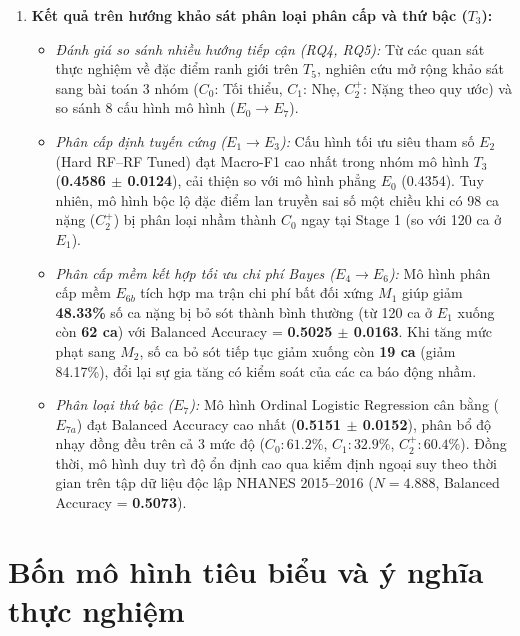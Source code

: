 \begin{enumerate}
    \item \textbf{Kết quả trên hướng khảo sát phân loại phân cấp và thứ bậc ($T_3$):}
    \begin{itemize}
        \item \textit{Đánh giá so sánh nhiều hướng tiếp cận (RQ4, RQ5):} Từ các quan sát thực nghiệm về đặc điểm ranh giới trên $T_5$, nghiên cứu mở rộng khảo sát sang bài toán 3 nhóm ($C_0$: Tối thiểu, $C_1$: Nhẹ, $C_2^+$: Nặng theo quy ước) và so sánh 8 cấu hình mô hình ($E_0 \to E_7$).
        \item \textit{Phân cấp định tuyến cứng ($E_1 \to E_3$):} Cấu hình tối ưu siêu tham số $E_2$ (Hard RF--RF Tuned) đạt Macro-F1 cao nhất trong nhóm mô hình $T_3$ (\textbf{0.4586 $\pm$ 0.0124}), cải thiện so với mô hình phẳng $E_0$ (0.4354). Tuy nhiên, mô hình bộc lộ đặc điểm lan truyền sai số một chiều khi có 98 ca nặng ($C_2^+$) bị phân loại nhầm thành $C_0$ ngay tại Stage 1 (so với 120 ca ở $E_1$).
        \item \textit{Phân cấp mềm kết hợp tối ưu chi phí Bayes ($E_4 \to E_6$):} Mô hình phân cấp mềm $E_{6b}$ tích hợp ma trận chi phí bất đối xứng $M_1$ giúp giảm \textbf{48.33\%} số ca nặng bị bỏ sót thành bình thường (từ 120 ca ở $E_1$ xuống còn \textbf{62 ca}) với Balanced Accuracy = \textbf{0.5025 $\pm$ 0.0163}. Khi tăng mức phạt sang $M_2$, số ca bỏ sót tiếp tục giảm xuống còn \textbf{19 ca} (giảm 84.17\%), đổi lại sự gia tăng có kiểm soát của các ca báo động nhầm.
        \item \textit{Phân loại thứ bậc ($E_7$):} Mô hình Ordinal Logistic Regression cân bằng ($E_{7a}$) đạt Balanced Accuracy cao nhất (\textbf{0.5151 $\pm$ 0.0152}), phân bổ độ nhạy đồng đều trên cả 3 mức độ ($C_0: 61.2\%$, $C_1: 32.9\%$, $C_2^+: 60.4\%$). Đồng thời, mô hình duy trì độ ổn định cao qua kiểm định ngoại suy theo thời gian trên tập dữ liệu độc lập NHANES 2015--2016 ($N = 4.888$, Balanced Accuracy = \textbf{0.5073}).
    \end{itemize}
\end{enumerate}

\section{Bốn mô hình tiêu biểu và ý nghĩa thực nghiệm}
\label{sec:khuyen-nghi-mo-hinh}

